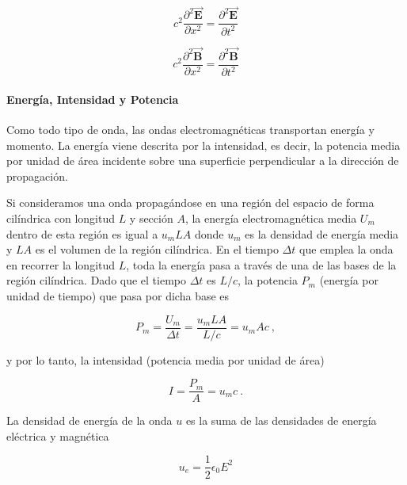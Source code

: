 \documentclass{tufte-handout}
\begin{document}
\begin{equation}
c^2 \displaystyle\frac{\partial^2 \mathbf{\vec{E}}}{\partial x^2} = \displaystyle\frac{\partial^2 \mathbf{\vec{E}}}{\partial t^2}
\end{equation}

\begin{equation}
c^2 \displaystyle\frac{\partial^2 \mathbf{\vec{B}}}{\partial x^2} = \displaystyle\frac{\partial^2 \mathbf{\vec{B}}}{\partial t^2}
\end{equation}

\paragraph{Energía, Intensidad y Potencia}

Como todo tipo de onda, las ondas electromagnéticas transportan energía y momento. La energía viene descrita por la intensidad, es decir, la potencia media por unidad de área incidente sobre una superficie perpendicular a la dirección de propagación.

Si consideramos una onda propagándose en una región del espacio de forma cilíndrica con longitud $L$ y sección $A$, la energía electromagnética media $U_m$ dentro de esta región es igual a $u_m LA$ donde $u_m$ es la densidad de energía media y $LA$ es el volumen de la región cilíndrica. En el tiempo $\Delta t$ que emplea la onda en recorrer la longitud $L$, toda la energía pasa a través de una de las bases de la región cilíndrica. Dado que el tiempo $\Delta t$ es $L/c$, la potencia $P_m$ (energía por unidad de tiempo) que pasa por dicha base es

\begin{equation}
P_m = \displaystyle\frac{U_m}{\Delta t} = \displaystyle\frac{u_m LA}{L/c} = u_m Ac~,
\end{equation}

y por lo tanto, la intensidad (potencia media por unidad de área)

\begin{equation}
I = \displaystyle\frac{P_m}{A} = u_m c~.
\end{equation}

La densidad de energía de la onda $u$ es la suma de las densidades de energía eléctrica y magnética 

\begin{equation}
u_e = \displaystyle\frac{1}{2}\epsilon_0 E^2
\end{equation}
\end{document}
